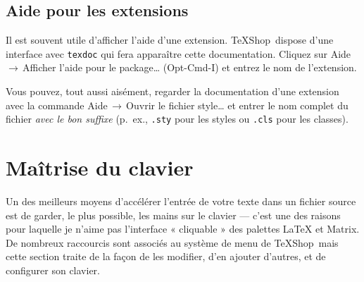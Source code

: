\documentclass[11pt,french]{article}
\newcommand{\TS}{\textsf{\TeX Shop}}
\newcommand{\cmd}[1]{\textsf{#1}}
\newcommand{\mnu}[1]{\textsf{#1}}
\newcommand{\To}{\,\(\to\)\,}
\begin{document}

\subsection{Aide pour les extensions}

Il est souvent utile d'afficher l'aide d'une extension. \TS\ dispose d'une interface avec \texttt{texdoc} qui fera apparaître cette documentation. Cliquez sur \mnu{Aide}\To\mnu{Afficher l'aide pour le package…} (\cmd{Opt-Cmd-I}) et entrez le nom de l'extension.

Vous pouvez, tout aussi aisément, regarder la documentation d'une extension avec la commande \mnu{Aide}\To\mnu{Ouvrir le fichier style…} et entrer le nom complet du fichier \emph{avec le bon suffixe} (p.~ex., \texttt{.sty} pour les styles ou \texttt{.cls} pour les classes).

%


\section{Maîtrise du clavier}

Un des meilleurs moyens d'accélérer l'entrée de votre texte dans un fichier source est de garder, le plus possible, les mains sur le clavier --- c'est une des raisons pour laquelle je n'aime pas l'interface « cliquable » des palettes LaTeX et Matrix. De nombreux raccourcis sont associés au système de menu de \TS\ mais cette section traite de la façon de les modifier, d'en ajouter d'autres, et de configurer son clavier.
\end{document}
